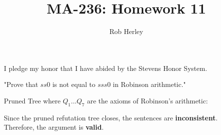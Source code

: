 \documentclass[12pt]{article}
\begin{document}
\title{MA-236: Homework 11}
\author{Rob Herley}
\maketitle

\begin{center}
I pledge my honor that I have abided by the Stevens Honor System.
\end{center}

\begin{center}
  "Prove that $ss0$ is not equal to $sss0$ in Robinson arithmetic."
\end{center}

\noindent
Pruned Tree where $Q_1...Q_7$ are the axioms of Robinson's arithmetic:

\begin{center}
  \end{center}

\noindent
Since the pruned refutation tree closes, the sentences are \textbf{inconsistent}.
Therefore, the argument is \textbf{valid}.
\end{document}
